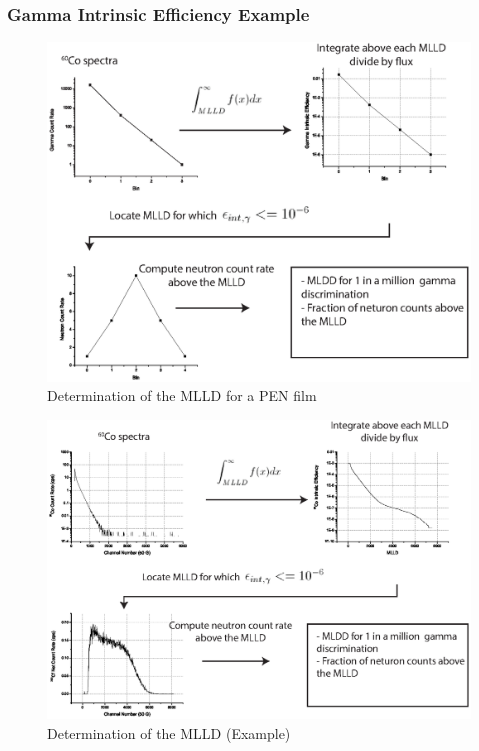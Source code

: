 \begin{frame}[allowframebreaks]
    \frametitle{Gamma Intrinsic Efficiency Example}
	\begin{figure}
		\centering
		\includegraphics[height=0.5\textheight]{images/CartoonIntEffSimple.eps}
		\caption{Determination of the MLLD for a PEN film}
		\label{fig:CartoonIntEffSimple}
	\end{figure}
	\begin{figure}
		\centering
		\includegraphics[height=0.5\textheight]{images/CartoonIntEffReal.eps}
		\caption{Determination of the MLLD (Example)}
		\label{fig:ElectronicsPSD}
	\end{figure}
\end{frame}
